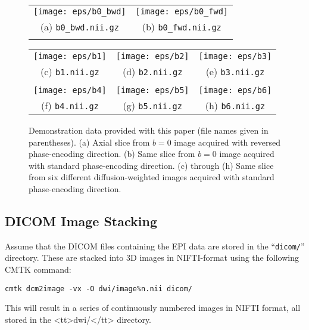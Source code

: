 \documentclass{InsightArticle}
\begin{document}
\begin{figure}[tbp]
\begin{center}
\begin{tabular}{cc}
\texttt{[image: eps/b0\_bwd]} &
\texttt{[image: eps/b0\_fwd]} \\
(a) \texttt{b0\_bwd.nii.gz} & (b)  \texttt{b0\_fwd.nii.gz}\\
\\
\end{tabular}
\begin{tabular}{ccc}
\texttt{[image: eps/b1]} &
\texttt{[image: eps/b2]} &
\texttt{[image: eps/b3]} \\
(c) \texttt{b1.nii.gz} & (d) \texttt{b2.nii.gz} & (e) \texttt{b3.nii.gz} \\
\\
\texttt{[image: eps/b4]} &
\texttt{[image: eps/b5]} &
\texttt{[image: eps/b6]} \\
(f) \texttt{b4.nii.gz} & (g) \texttt{b5.nii.gz} & (h) \texttt{b6.nii.gz} \\
\end{tabular}
\end{center}
\caption{Demonstration data provided with this paper (file names given in
  parentheses). (a) Axial slice from $b=0$ image acquired with reversed phase-encoding
  direction. (b) Same slice from $b=0$ image acquired with standard
  phase-encoding direction. (c) through (h) Same slice from six different
  diffusion-weighted images acquired with standard phase-encoding direction.}
\label{fig:B0FwBw}
\end{figure}

\subsection{DICOM Image Stacking}

Assume that the DICOM files containing the EPI data are stored in the
``\texttt{dicom/}'' directory. These are stacked into 3D images in
NIFTI-format using the following CMTK command:
\begin{verbatim}
cmtk dcm2image -vx -O dwi/image%n.nii dicom/
\end{verbatim}

This will result in a series of continuously numbered images in NIFTI format,
all stored in the <tt>dwi/</tt> directory.
\end{document}

